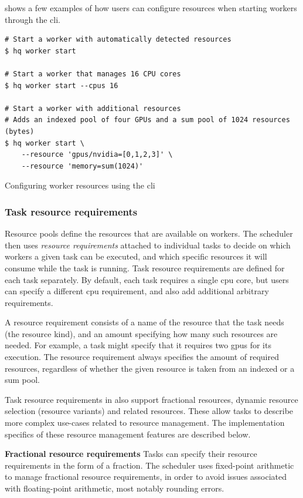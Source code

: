  shows a few examples of how users can configure resources
when starting workers through the \gls{cli}.

\begin{listing}[h]
	\begin{verbatim}
# Start a worker with automatically detected resources
$ hq worker start

# Start a worker that manages 16 CPU cores
$ hq worker start --cpus 16

# Start a worker with additional resources
# Adds an indexed pool of four GPUs and a sum pool of 1024 resources (bytes)
$ hq worker start \
	--resource 'gpus/nvidia=[0,1,2,3]' \
	--resource 'memory=sum(1024)'
	\end{verbatim}
	\caption{Configuring worker resources using the \hyperqueue{} \acrshort{cli}}
	\label{lst:hq-cli-worker-resources}
\end{listing}

\subsubsection*{Task resource requirements}
Resource pools define the resources that are available on workers. The scheduler then uses
\emph{resource requirements} attached to individual tasks to decide on which workers a given task can be
executed, and which specific resources it will consume while the task is running. Task resource
requirements are defined for each task separately. By default, each task requires a single
\gls{cpu} core, but users can specify a different \gls{cpu}
requirement, and also add additional arbitrary requirements.

A resource requirement consists of a name of the resource that the task needs (the resource kind),
and an amount specifying how many such resources are needed. For example, a task might specify that
it requires two \glspl{gpu} for its execution. The resource requirement always
specifies the amount of required resources, regardless of whether the given resource is taken from
an indexed or a sum pool.

Task resource requirements in \hyperqueue{} also support fractional resources, dynamic
resource selection (resource variants) and related resources. These allow tasks to describe more
complex use-cases related to resource management. The implementation specifics of these resource
management features are described below.

\textbf{Fractional resource requirements} Tasks can specify
their resource requirements in the form of a fraction. The scheduler uses fixed-point arithmetic to
manage fractional resource requirements, in order to avoid issues associated with floating-point
arithmetic, most notably rounding errors.

